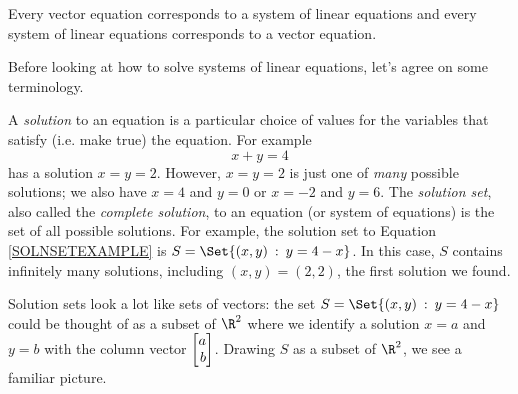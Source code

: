 	\begin{emphbox}[Takeaway]
		Every vector equation corresponds to a system of linear equations and every system of linear equations
		corresponds to a vector equation.
	\end{emphbox}


	Before looking at how to solve systems of linear equations, let's agree on some terminology.

	A \emph{solution} to an equation is a particular choice of values for the variables that satisfy (i.e. make true)
	the equation. For example
	\begin{equation}
		\label{SOLNSETEXAMPLE}
		x+y=4
	\end{equation}
	has a solution $x=y=2$. However, $x=y=2$ is just one of \emph{many} possible solutions; we also have $x=4$ and $y=0$ or $x=-2$ and
	$y=6$. The \emph{solution set},
	also called the \emph{complete solution}, to an equation (or system of equations) is the set of all possible solutions.
	For example, the solution set to Equation \eqref{SOLNSETEXAMPLE} is $S=\Set{(x,y)\given y=4-x}$. %
	In this case, $S$ contains infinitely many solutions, including $(x,y)=(2,2)$, the first solution we found.

	Solution sets look a lot like sets of vectors: the set $S=\Set{(x,y)\given y=4-x}$ could be thought of as a subset of $\R^2$
	where we identify a solution $x=a$ and $y=b$ with the column vector $\mat{a\\b}$. Drawing $S$ as a subset of $\R^2$, we see a familiar
	picture.

	\begin{center}
	\end{center}

